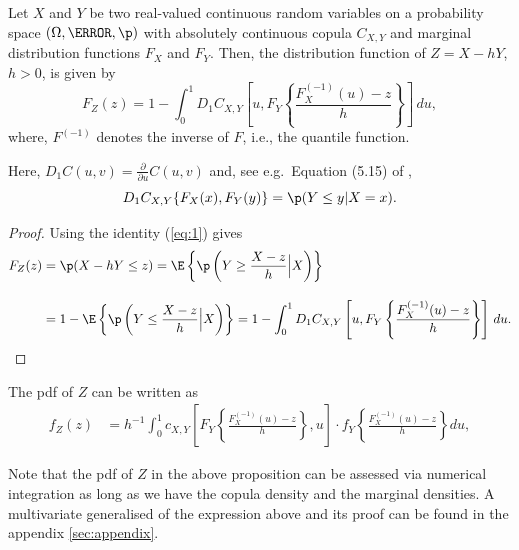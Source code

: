 \begin{proposition}
  \label{prop:dfrh}
  Let $X$ and $Y$ be two real-valued continuous random
  variables on a
  probability space $(\Omega, \F, \p)$ with
  absolutely continuous copula $C_{X, Y}$ and marginal distribution functions $F_{X}$
  and $F_{Y}$. Then, the distribution function of $Z=X-hY$, $h >0$,  is given by
  \begin{equation}
    \label{eq:3}
    F_{Z}(z) = 1- \int^1_0 D_1 C_{X, Y}
    \left[ u, F_{Y} \left\{ \frac{F^{(-1)}_{X}(u)-z}{h} \right\}
    \right]\, d u,   
  \end{equation}
  where, $F^{(-1)}$ denotes the inverse of $F$, i.e., the quantile
function.
\end{proposition}
Here, $D_1 C(u,v)=\displaystyle \frac{\partial}{\partial u}
C(u,v)$ and, see e.g.\ Equation (5.15) of \citet{McNeil2005},
\begin{equation}
  \label{eq:1}
  D_1 C_{X,Y}\{F_X(x), F_Y(y)\} = \p(Y\leq y|X=x).
\end{equation}
\begin{proof}
  Using the identity (\ref{eq:1}) gives
  \begin{align*}
    F_{Z}(z) &= \p(X - h Y\leq z) %
                 = \E\left\{\p\left(Y\geq \frac{X-z}{h}\Big|
                 X\right)\right\}\\[10pt]
               &= 1-\E\left\{\p\left(Y\leq \frac{X-z}{h}\Big|
                 X\right)\right\}%
               = 1- \int_0^1 D_1 C_{X, Y}\left[u,
                 F_{Y}\left\{\frac{F^{(-1)}_{X}(u) -
                 z}{h}\right\}\right]\, d u.
  \end{align*}
  \end{proof}


\begin{corollary} The pdf of $Z$ can be written as
  \begin{align}
  f_{Z}(z) &= h^{-1}\int_0^1 c_{X, Y} \left[
  F_{Y}\left\{\frac{F^{(-1)}_{X}(u)-z}{h}\right\}, u
  \right]
   \cdot
  f_{Y}
  \left\{\frac{F^{(-1)}_{X}(u)-z}{h}\right\} du, \label{eq:density1}
  \end{align}
  \end{corollary}
Note that the pdf of $Z$ in the above proposition can be assessed via numerical integration
as long as we have the copula density and the marginal
densities.
A multivariate generalised of the expression above and its proof can be found in the
appendix \ref{sec:appendix}.

